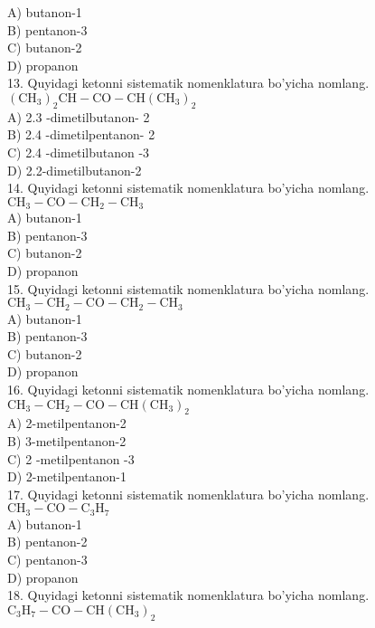 A) butanon-1\\
B) pentanon-3\\
C) butanon-2\\
D) propanon\\
13. Quyidagi ketonni sistematik nomenklatura bo'yicha nomlang.\\
$\left(\mathrm{CH}_{3}\right)_{2} \mathrm{CH}-\mathrm{CO}-\mathrm{CH}\left(\mathrm{CH}_{3}\right)_{2}$\\
A) 2.3 -dimetilbutanon- 2\\
B) 2.4 -dimetilpentanon- 2\\
C) 2.4 -dimetilbutanon -3\\
D) 2.2-dimetilbutanon-2\\
14. Quyidagi ketonni sistematik nomenklatura bo'yicha nomlang.\\
$\mathrm{CH}_{3}-\mathrm{CO}-\mathrm{CH}_{2}-\mathrm{CH}_{3}$\\
A) butanon-1\\
B) pentanon-3\\
C) butanon-2\\
D) propanon\\
15. Quyidagi ketonni sistematik nomenklatura bo'yicha nomlang. $\mathrm{CH}_{3}-\mathrm{CH}_{2}-\mathrm{CO}-\mathrm{CH}_{2}-\mathrm{CH}_{3}$\\
A) butanon-1\\
B) pentanon-3\\
C) butanon-2\\
D) propanon\\
16. Quyidagi ketonni sistematik nomenklatura bo'yicha nomlang. $\mathrm{CH}_{3}-\mathrm{CH}_{2}-\mathrm{CO}-\mathrm{CH}\left(\mathrm{CH}_{3}\right)_{2}$\\
A) 2-metilpentanon-2\\
B) 3-metilpentanon-2\\
C) 2 -metilpentanon -3\\
D) 2-metilpentanon-1\\
17. Quyidagi ketonni sistematik nomenklatura bo'yicha nomlang. $\mathrm{CH}_{3}-\mathrm{CO}-\mathrm{C}_{3} \mathrm{H}_{7}$\\
A) butanon-1\\
B) pentanon-2\\
C) pentanon-3\\
D) propanon\\
18. Quyidagi ketonni sistematik nomenklatura bo'yicha nomlang.\\
$\mathrm{C}_{3} \mathrm{H}_{7}-\mathrm{CO}-\mathrm{CH}\left(\mathrm{CH}_{3}\right)_{2}$\\
